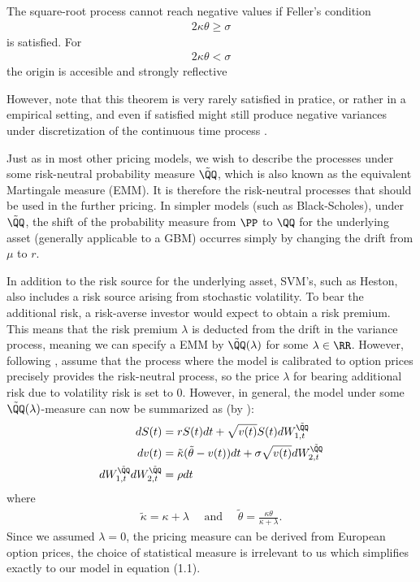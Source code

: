 \documentclass[11pt]{article}
\numberwithin{equation}{section}
\begin{document}
\begin{theorem}
The square-root process cannot reach negative values if Feller's condition
\begin{align*}
    2\kappa\theta \geq \sigma
\end{align*}
is satisfied. For
\begin{align*}
    2\kappa\theta < \sigma
\end{align*}
the origin is accesible and strongly reflective
\end{theorem}
However, note that this theorem is very rarely satisfied in pratice, or rather
in a empirical setting, and even if
satisfied might still produce negative variances under discretization of the
continuous time process \cite{van2010efficient}.


Just as in most other pricing models, we wish to describe the processes under
some risk-neutral probability measure $\tilde{\QQ}$, which is also known as the
equivalent Martingale measure (EMM). It is therefore the risk-neutral processes that
should be used in the further pricing. In simpler models (such as
Black-Scholes), under $\tilde{\QQ}$, the shift of the probability measure
from $\PP$ to $\QQ$ for the underlying asset (generally applicable to a GBM)
occurres simply by changing the drift from $\mu$ to $r$.

In addition to the risk source for the underlying asset, SVM's, such as Heston,
also includes a risk source arising from stochastic volatility. To bear the
additional risk, a risk-averse investor would expect to obtain a risk premium.
This means that the risk premium $\lambda$ is deducted from the drift in the
variance process, meaning we can specify a EMM by $\tilde{\QQ}(\lambda)$ for
some $\lambda\in \RR$. However, following \cite{gatheral2011volatility}, assume that the
process
where the model is calibrated to option prices precisely provides the
risk-neutral process, so the price $\lambda$ for bearing additional risk due to
volatility risk is set to 0.
However, in general, the model under some $\tilde{\QQ}(\lambda)$-measure can now be summarized as (by \cite{heston1993closed}):
\begin{align*}
dS(t) &= rS(t) dt + \sqrt{v(t)}S(t) dW^{\tilde{\QQ}}_{1,t} \\
dv(t) &= \tilde{\kappa}(\tilde{\theta} - v(t)) dt + \sigma \sqrt{v(t)} dW^{\tilde{\QQ}}_{2,t} \\
dW^{\tilde{\QQ}}_{1,t} dW^{\tilde{\QQ}}_{2,t} &= \rho dt
\end{align*}
where
\begin{align*}
    \tilde{\kappa}=\kappa+\lambda \quad \text{ and } \quad \tilde{\theta}=\frac{\kappa\theta}{\kappa + \lambda}.
\end{align*}
Since we assumed $\lambda=0$, the pricing measure can be derived from European option prices, the choice of
statistical measure is irrelevant to us which simplifies exactly to our model
in equation (1.1).
\end{document}
